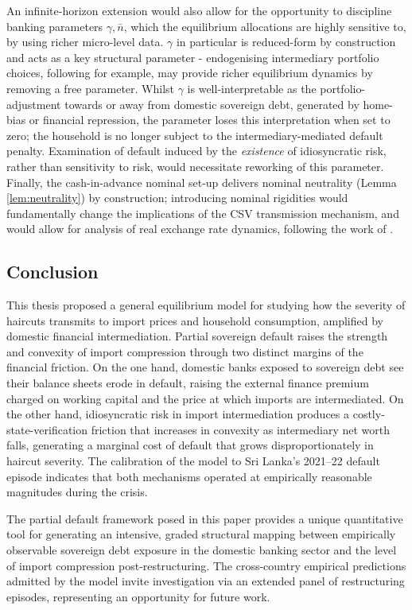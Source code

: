 \documentclass[11pt]{article}
\theoremstyle{definition}
\theoremstyle{plain}
\theoremstyle{remark}
\begin{document}
An infinite-horizon extension would also allow for the opportunity to discipline banking parameters $\gamma,\bar{n}$, which the equilibrium allocations are highly sensitive to, by using richer micro-level data. $\gamma$ in particular is reduced-form by construction and acts as a key structural parameter - endogenising intermediary portfolio choices, following \citet{farhi_deadly_2018} for example, may provide richer equilibrium dynamics by removing a free parameter. Whilst $\gamma$ is well-interpretable as the portfolio-adjustment towards or away from domestic sovereign debt, generated by home-bias or financial repression, the parameter loses this interpretation when set to zero; the household is no longer subject to the intermediary-mediated default penalty. Examination of default induced by the \textit{existence} of idiosyncratic risk, rather than sensitivity to risk, would necessitate reworking of this parameter. Finally, the cash-in-advance nominal set-up delivers nominal neutrality (Lemma \ref{lem:neutrality}) by construction; introducing nominal rigidities would fundamentally change the implications of the CSV transmission mechanism, and would allow for analysis of real exchange rate dynamics, following the work of \citet{na_twin_2018}.

\subsection{Conclusion}

This thesis proposed a general equilibrium model for studying how the severity of haircuts transmits to import prices and household consumption, amplified by domestic financial intermediation. Partial sovereign default raises the strength and convexity of import compression through two distinct margins of the financial friction. On the one hand, domestic banks exposed to sovereign debt see their balance sheets erode in default, raising the external finance premium charged on working capital and the price at which imports are intermediated. On the other hand, idiosyncratic risk in import intermediation produces a costly-state-verification friction that increases in convexity as intermediary net worth falls, generating a marginal cost of default that grows disproportionately in haircut severity. The calibration of the model to Sri Lanka's 2021--22 default episode indicates that both mechanisms operated at empirically reasonable magnitudes during the crisis.

The partial default framework posed in this paper provides a unique quantitative tool for generating an intensive, graded structural mapping between empirically observable sovereign debt exposure in the domestic banking sector and the level of import compression post-restructuring. The cross-country empirical predictions admitted by the model invite investigation via an extended panel of restructuring episodes, representing an opportunity for future work.
\end{document}
